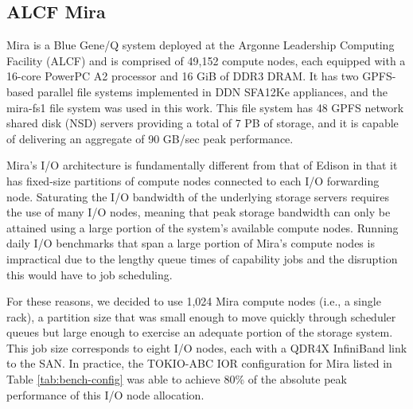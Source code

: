 \subsection{ALCF Mira} \label{sec:platforms/mira}

 Mira is a Blue Gene/Q system deployed at the Argonne Leadership Computing Facility (ALCF) and is comprised of 49,152 compute nodes, each equipped with a 16-core PowerPC A2 processor and 16 GiB of DDR3 DRAM.
It has two GPFS-based parallel file systems implemented in DDN SFA12Ke appliances, and the mira-fs1 file system was used in this work.
This file system has 48 GPFS network shared disk (NSD) servers providing a total of 7 PB of storage, and it is capable of delivering an aggregate of 90 GB/sec peak performance.


Mira's I/O architecture is fundamentally different from that of Edison in that it has fixed-size partitions of compute nodes connected to each I/O forwarding node.
Saturating the I/O bandwidth of the underlying storage servers requires the
use of many I/O nodes, meaning that peak storage bandwidth can only be
attained using a large portion of the system's available compute nodes.
Running daily I/O benchmarks that span a large portion of Mira's compute
nodes is impractical due to the lengthy queue times of capability jobs and
the disruption this would have to job scheduling.

For these reasons, we decided to use 1,024 Mira compute nodes (i.e., a single
rack), a partition size that was small enough to move quickly through
scheduler queues but large enough to exercise an adequate portion of the
storage system.  This job size corresponds to eight I/O nodes, each with a QDR4X InfiniBand link to the SAN. %
In practice, the TOKIO-ABC IOR configuration for Mira listed in Table \ref{tab:bench-config} was able to achieve 80\% of the absolute peak performance of this I/O node allocation.

